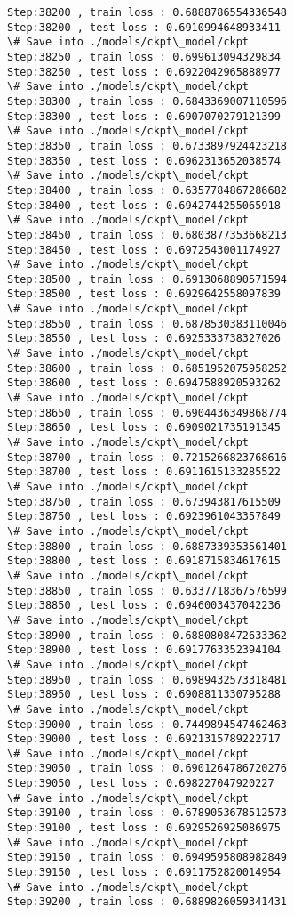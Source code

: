 \documentclass[11pt]{article}
\begin{document}
\begin{Verbatim}[commandchars=\\\{\}]
Step:38200 , train loss : 0.6888786554336548
Step:38200 , test loss : 0.6910994648933411
\# Save into ./models/ckpt\_model/ckpt
Step:38250 , train loss : 0.699613094329834
Step:38250 , test loss : 0.6922042965888977
\# Save into ./models/ckpt\_model/ckpt
Step:38300 , train loss : 0.6843369007110596
Step:38300 , test loss : 0.6907070279121399
\# Save into ./models/ckpt\_model/ckpt
Step:38350 , train loss : 0.6733897924423218
Step:38350 , test loss : 0.6962313652038574
\# Save into ./models/ckpt\_model/ckpt
Step:38400 , train loss : 0.6357784867286682
Step:38400 , test loss : 0.6942744255065918
\# Save into ./models/ckpt\_model/ckpt
Step:38450 , train loss : 0.6803877353668213
Step:38450 , test loss : 0.6972543001174927
\# Save into ./models/ckpt\_model/ckpt
Step:38500 , train loss : 0.6913068890571594
Step:38500 , test loss : 0.6929642558097839
\# Save into ./models/ckpt\_model/ckpt
Step:38550 , train loss : 0.6878530383110046
Step:38550 , test loss : 0.6925333738327026
\# Save into ./models/ckpt\_model/ckpt
Step:38600 , train loss : 0.6851952075958252
Step:38600 , test loss : 0.6947588920593262
\# Save into ./models/ckpt\_model/ckpt
Step:38650 , train loss : 0.6904436349868774
Step:38650 , test loss : 0.6909021735191345
\# Save into ./models/ckpt\_model/ckpt
Step:38700 , train loss : 0.7215266823768616
Step:38700 , test loss : 0.6911615133285522
\# Save into ./models/ckpt\_model/ckpt
Step:38750 , train loss : 0.673943817615509
Step:38750 , test loss : 0.6923961043357849
\# Save into ./models/ckpt\_model/ckpt
Step:38800 , train loss : 0.6887339353561401
Step:38800 , test loss : 0.6918715834617615
\# Save into ./models/ckpt\_model/ckpt
Step:38850 , train loss : 0.6337718367576599
Step:38850 , test loss : 0.6946003437042236
\# Save into ./models/ckpt\_model/ckpt
Step:38900 , train loss : 0.6880808472633362
Step:38900 , test loss : 0.6917763352394104
\# Save into ./models/ckpt\_model/ckpt
Step:38950 , train loss : 0.6989432573318481
Step:38950 , test loss : 0.6908811330795288
\# Save into ./models/ckpt\_model/ckpt
Step:39000 , train loss : 0.7449894547462463
Step:39000 , test loss : 0.6921315789222717
\# Save into ./models/ckpt\_model/ckpt
Step:39050 , train loss : 0.6901264786720276
Step:39050 , test loss : 0.698227047920227
\# Save into ./models/ckpt\_model/ckpt
Step:39100 , train loss : 0.6789053678512573
Step:39100 , test loss : 0.6929526925086975
\# Save into ./models/ckpt\_model/ckpt
Step:39150 , train loss : 0.6949595808982849
Step:39150 , test loss : 0.6911752820014954
\# Save into ./models/ckpt\_model/ckpt
Step:39200 , train loss : 0.6889826059341431

\end{Verbatim}
\end{document}
